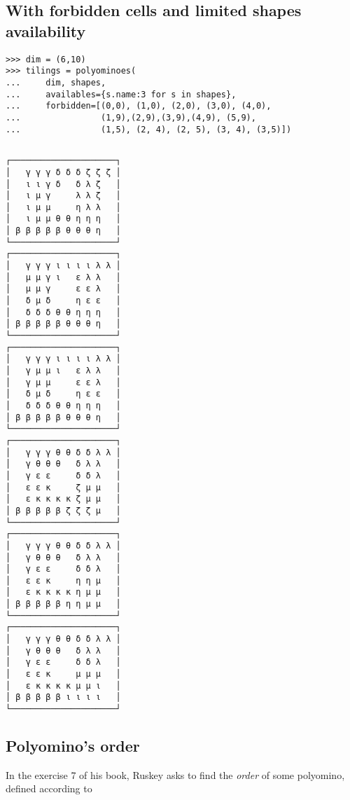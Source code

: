 \newpage
\subsection{With forbidden cells and limited shapes availability}

\begin{verbatim}
>>> dim = (6,10)
>>> tilings = polyominoes(
...     dim, shapes,
...     availables={s.name:3 for s in shapes},
...     forbidden=[(0,0), (1,0), (2,0), (3,0), (4,0),
...                (1,9),(2,9),(3,9),(4,9), (5,9),
...                (1,5), (2, 4), (2, 5), (3, 4), (3,5)])
\end{verbatim}

\begin{margintable}%
\inputminted[fontsize=\footnotesize,]{python}{backtracking/pentominoes-regular-snippet.py}
{\footnotesize
\begin{verbatim}
┌─────────────────────┐
│   γ γ γ δ δ δ ζ ζ ζ │
│   ι ι γ δ   δ λ ζ   │
│   ι μ γ     λ λ ζ   │
│   ι μ μ     η λ λ   │
│   ι μ μ θ θ η η η   │
│ β β β β β θ θ θ η   │
└─────────────────────┘
┌─────────────────────┐
│   γ γ γ ι ι ι ι λ λ │
│   μ μ γ ι   ε λ λ   │
│   μ μ γ     ε ε λ   │
│   δ μ δ     η ε ε   │
│   δ δ δ θ θ η η η   │
│ β β β β β θ θ θ η   │
└─────────────────────┘
┌─────────────────────┐
│   γ γ γ ι ι ι ι λ λ │
│   γ μ μ ι   ε λ λ   │
│   γ μ μ     ε ε λ   │
│   δ μ δ     η ε ε   │
│   δ δ δ θ θ η η η   │
│ β β β β β θ θ θ η   │
└─────────────────────┘
┌─────────────────────┐
│   γ γ γ θ θ δ δ λ λ │
│   γ θ θ θ   δ λ λ   │
│   γ ε ε     δ δ λ   │
│   ε ε κ     ζ μ μ   │
│   ε κ κ κ κ ζ μ μ   │
│ β β β β β ζ ζ ζ μ   │
└─────────────────────┘
┌─────────────────────┐
│   γ γ γ θ θ δ δ λ λ │
│   γ θ θ θ   δ λ λ   │
│   γ ε ε     δ δ λ   │
│   ε ε κ     η η μ   │
│   ε κ κ κ κ η μ μ   │
│ β β β β β η η μ μ   │
└─────────────────────┘
┌─────────────────────┐
│   γ γ γ θ θ δ δ λ λ │
│   γ θ θ θ   δ λ λ   │
│   γ ε ε     δ δ λ   │
│   ε ε κ     μ μ μ   │
│   ε κ κ κ κ μ μ ι   │
│ β β β β β ι ι ι ι   │
└─────────────────────┘
\end{verbatim}
}
\end{margintable}

\subsection{Polyomino's order}

In the exercise 7 of his book, Ruskey asks to find the \textit{order} of some
polyomino, defined according to

